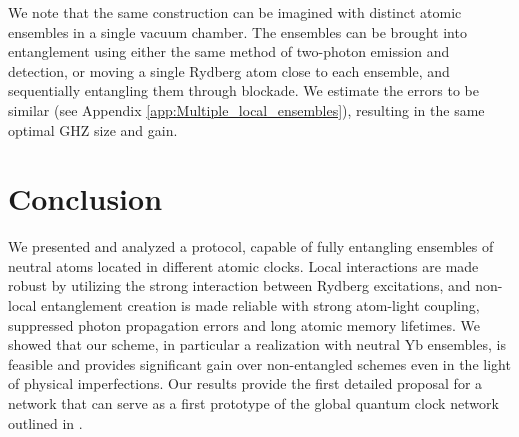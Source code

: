 We note that the same construction can be imagined
with distinct atomic ensembles in a single vacuum chamber. The ensembles can be
brought into entanglement using either the same method of two-photon emission
and detection, or moving a single Rydberg atom close to each ensemble, and
sequentially entangling them through blockade. We estimate the errors to be
similar (see Appendix \ref{app:Multiple_local_ensembles}), resulting in the same optimal GHZ size
and gain.




\section{Conclusion}

We presented and analyzed a protocol, capable of fully entangling ensembles of
neutral atoms located in different atomic clocks. Local interactions are made
robust by utilizing the strong interaction between Rydberg excitations, and
non-local entanglement creation is made reliable with strong atom-light
coupling, suppressed photon propagation errors and long atomic memory lifetimes.
We showed that our scheme, in particular a realization with neutral Yb
ensembles, is feasible and provides significant gain over non-entangled schemes
even in the light of physical imperfections. Our results provide the first
detailed proposal for a network that can serve as a first prototype of the
global quantum clock network outlined in \cite{Komar2014}.
